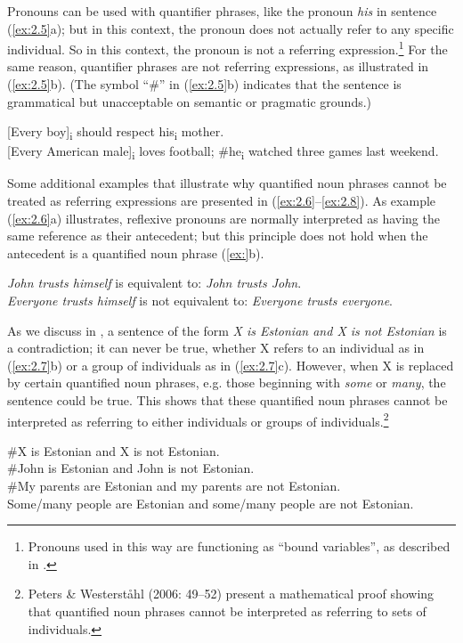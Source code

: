 Pronouns can be used with quantifier phrases, like the pronoun \textit{his} in sentence (\ref{ex:2.5}a); but in this context, the pronoun does not actually refer to any specific individual. So in this context, the pronoun is not a referring expression.\footnote{Pronouns used in this way are functioning as “bound variables”, as described in .} For the same reason, quantifier phrases are not referring expressions, as illustrated in (\ref{ex:2.5}b). (The symbol “\#” in (\ref{ex:2.5}b) indicates that the sentence is grammatical but unacceptable on semantic or pragmatic grounds.)


\ea \label{ex:2.5}
\ea{} [Every boy]\textsubscript{i} should respect his\textsubscript{i} mother.\\        
\ex{} [Every American male]\textsubscript{i} loves football; \#he\textsubscript{i} watched three games last weekend.
\z
\z

Some additional examples that illustrate why quantified noun phrases cannot be treated as referring expressions are presented in (\ref{ex:2.6}--\ref{ex:2.8}). As example (\ref{ex:2.6}a) illustrates, reflexive pronouns are normally interpreted as having the same reference as their antecedent; but this principle does not hold when the antecedent is a quantified noun phrase (\ref{ex:}b).


\ea \label{ex:2.6}
\ea \textit{John trusts himself}  is equivalent to:  \textit{John trusts John}.\\
\ex \textit{Everyone trusts himself}  is not equivalent to:  \textit{Everyone trusts everyone}.
\z
\z


As we discuss in , a sentence of the form \textit{X is Estonian and X is not Estonian} is a contradiction; it can never be true, whether X refers to an individual as in (\ref{ex:2.7}b) or a group of individuals as in (\ref{ex:2.7}c). However, when X is replaced by certain quantified noun phrases, e.g. those beginning with \textit{some} or \textit{many}, the sentence could be true. This shows that these quantified noun phrases cannot be interpreted as referring to either individuals or groups of individuals.\footnote{Peters \& Westerståhl (2006: 49–52) present a mathematical proof showing that quantified noun phrases cannot be interpreted as referring to sets of individuals.}


\begin{stylepoints}  \label{ex:2.7}
\ea \#X is Estonian and X is not Estonian.\\
\ex \#John is Estonian and John is not Estonian.\\
\ex \#My parents are Estonian and my parents are not Estonian.\\
\ex Some/many people are Estonian and some/many people are not Estonian.
\z
\end{stylepoints}


